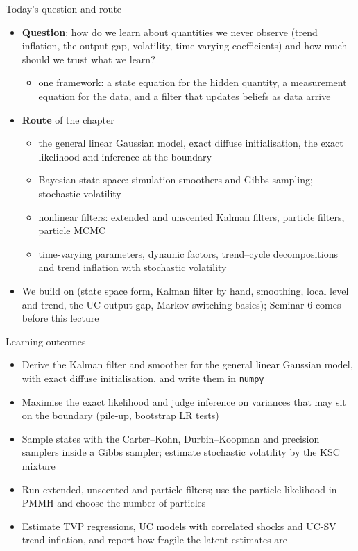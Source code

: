 
\begin{frame}{Today's question and route}
\itemsize{\small}
\begin{itemize}
    \item \textbf{Question}: how do we learn about quantities we never observe (trend inflation, the output gap, volatility, time-varying coefficients) and how much should we trust what we learn?
    \begin{itemize}
        \item one framework: a state equation for the hidden quantity, a measurement equation for the data, and a filter that updates beliefs as data arrive
    \end{itemize}
    \item \textbf{Route} of the chapter
    \begin{itemize}
        \item the general linear Gaussian model, exact diffuse initialisation, the exact likelihood and inference at the boundary
        \item Bayesian state space: simulation smoothers and Gibbs sampling; stochastic volatility
        \item nonlinear filters: extended and unscented Kalman filters, particle filters, particle MCMC
        \item time-varying parameters, dynamic factors, trend--cycle decompositions and trend inflation with stochastic volatility
    \end{itemize}
    \item We build on  (state space form, Kalman filter by hand, smoothing, local level and trend, the UC output gap, Markov switching basics); Seminar 6 comes before this lecture
\end{itemize}
\end{frame}

\begin{frame}{Learning outcomes}
\itemsize{\small}
\begin{itemize}
    \item Derive the Kalman filter and smoother for the general linear Gaussian model, with exact diffuse initialisation, and write them in \texttt{numpy}
    \item Maximise the exact likelihood and judge inference on variances that may sit on the boundary (pile-up, bootstrap LR tests)
    \item Sample states with the Carter--Kohn, Durbin--Koopman and precision samplers inside a Gibbs sampler; estimate stochastic volatility by the KSC mixture
    \item Run extended, unscented and particle filters; use the particle likelihood in PMMH and choose the number of particles
    \item Estimate TVP regressions, UC models with correlated shocks and UC-SV trend inflation, and report how fragile the latent estimates are
\end{itemize}
\end{frame}


